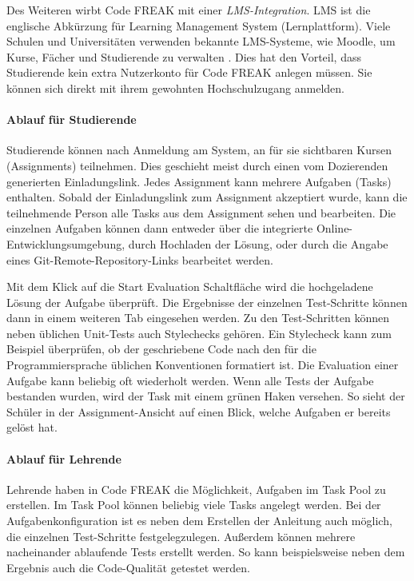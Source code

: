 Des Weiteren wirbt Code FREAK mit einer \emph{LMS-Integration}. LMS ist die
englische Abkürzung für Learning Management System (Lernplattform). Viele
Schulen und Universitäten verwenden bekannte LMS-Systeme, wie Moodle, um Kurse,
Fächer und Studierende zu verwalten \parencite{moodle}. Dies hat den Vorteil,
dass Studierende kein extra Nutzerkonto für Code FREAK anlegen müssen. Sie
können sich direkt mit ihrem gewohnten Hochschulzugang anmelden.

\paragraph{Ablauf für Studierende}
Studierende können nach Anmeldung am System, an für sie sichtbaren Kursen
(Assignments) teilnehmen. Dies geschieht meist durch einen vom Dozierenden
generierten Einladungslink. Jedes Assignment kann mehrere Aufgaben (Tasks)
enthalten. Sobald der Einladungslink zum Assignment akzeptiert
wurde, kann die teilnehmende Person alle Tasks aus dem Assignment sehen und
bearbeiten. Die einzelnen Aufgaben können dann entweder über die integrierte
Online-Entwicklungsumgebung, durch Hochladen der Lösung, oder durch die Angabe
eines Git-Remote-Repository-Links bearbeitet werden.

Mit dem Klick auf die \glqq Start Evaluation\grqq{} Schaltfläche wird die
hochgeladene Lösung der Aufgabe überprüft. Die Ergebnisse der einzelnen
Test-Schritte können dann in einem weiteren Tab eingesehen werden. Zu den
Test-Schritten können neben üblichen Unit-Tests auch Stylechecks gehören. Ein
Stylecheck kann zum Beispiel überprüfen, ob der geschriebene Code nach den für
die Programmiersprache üblichen Konventionen formatiert ist. Die Evaluation
einer Aufgabe kann beliebig oft wiederholt werden. Wenn alle Tests der Aufgabe
bestanden wurden, wird der Task mit einem grünen Haken versehen. So sieht der
Schüler in der Assignment-Ansicht auf einen Blick, welche Aufgaben er bereits
gelöst hat.

\paragraph{Ablauf für Lehrende}
Lehrende haben in Code FREAK die Möglichkeit, Aufgaben im Task Pool zu
erstellen. Im Task Pool können beliebig viele Tasks angelegt werden. Bei der
Aufgabenkonfiguration ist es neben dem Erstellen der Anleitung auch möglich, die
einzelnen Test-Schritte festgelegzulegen. Außerdem können mehrere nacheinander
ablaufende Tests erstellt werden. So kann beispielsweise neben dem Ergebnis auch
die Code-Qualität getestet werden.

